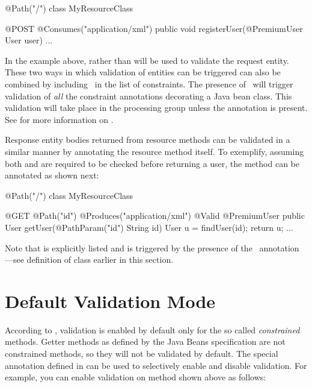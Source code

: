 \begin{listing}{1}
@Path("/")
class MyResourceClass {

  @POST
  @Consumes("application/xml")
  public void registerUser(@PremiumUser User user) {
    ...
  }
}
\end{listing}

In the example above,  rather than  will be used to validate the request entity. These two ways in which validation of entities can be triggered can also be combined by including \Valid\ in the list of constraints. The presence of \Valid\ will trigger validation of \emph{all} the constraint annotations decorating a Java bean class. This validation will take place in the  processing group unless the  annotation is present. See \cite{bv11} for more information on .

Response entity bodies returned from resource methods can be validated in a similar manner by annotating the resource method itself. To exemplify, assuming both  and  are required to be checked before returning a user, the  method can be annotated as shown next:

\begin{listing}{1}
@Path("/")
class MyResourceClass {

  @GET
  @Path("{id}")
  @Produces("application/xml")
  @Valid @PremiumUser
  public User getUser(@PathParam("id") String id) {
    User u = findUser(id);
    return u;
  }
  ...
}
\end{listing}

Note that  is explicitly listed and  is triggered by the presence of the \Valid\ annotation ---see definition of  class earlier in this section.

\section{Default Validation Mode}
\label{default_validation_mode}

According to \cite{bv11}, validation is enabled by default only for the so called {\em constrained} methods. Getter methods as defined by the Java Beans specification are not constrained methods, so they will not be validated by default. The special annotation  defined in \cite{bv11} can be used to selectively enable and disable validation. For example, you can enable validation on method  shown above as follows:

